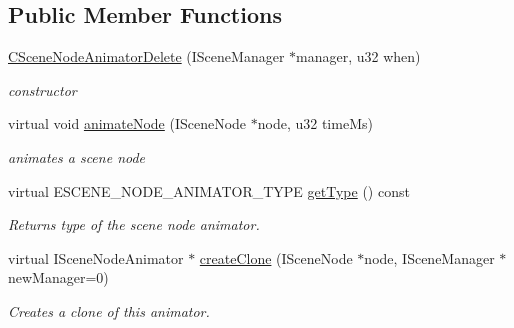 \subsection*{Public Member Functions}
\begin{DoxyCompactItemize}
\item 
\hypertarget{classirr_1_1scene_1_1_c_scene_node_animator_delete_abafe59c23c529ef832bee1e5ee795e9d}{\hyperlink{classirr_1_1scene_1_1_c_scene_node_animator_delete_abafe59c23c529ef832bee1e5ee795e9d}{C\-Scene\-Node\-Animator\-Delete} (I\-Scene\-Manager $\ast$manager, u32 when)}\label{classirr_1_1scene_1_1_c_scene_node_animator_delete_abafe59c23c529ef832bee1e5ee795e9d}

\begin{DoxyCompactList}\small\item\em constructor \end{DoxyCompactList}\item 
\hypertarget{classirr_1_1scene_1_1_c_scene_node_animator_delete_a66db5332d522d419f96350e77a6ae967}{virtual void \hyperlink{classirr_1_1scene_1_1_c_scene_node_animator_delete_a66db5332d522d419f96350e77a6ae967}{animate\-Node} (I\-Scene\-Node $\ast$node, u32 time\-Ms)}\label{classirr_1_1scene_1_1_c_scene_node_animator_delete_a66db5332d522d419f96350e77a6ae967}

\begin{DoxyCompactList}\small\item\em animates a scene node \end{DoxyCompactList}\item 
\hypertarget{classirr_1_1scene_1_1_c_scene_node_animator_delete_a9dd03a1b6f6e37f568caad65926b07ce}{virtual E\-S\-C\-E\-N\-E\-\_\-\-N\-O\-D\-E\-\_\-\-A\-N\-I\-M\-A\-T\-O\-R\-\_\-\-T\-Y\-P\-E \hyperlink{classirr_1_1scene_1_1_c_scene_node_animator_delete_a9dd03a1b6f6e37f568caad65926b07ce}{get\-Type} () const }\label{classirr_1_1scene_1_1_c_scene_node_animator_delete_a9dd03a1b6f6e37f568caad65926b07ce}

\begin{DoxyCompactList}\small\item\em Returns type of the scene node animator. \end{DoxyCompactList}\item 
virtual I\-Scene\-Node\-Animator $\ast$ \hyperlink{classirr_1_1scene_1_1_c_scene_node_animator_delete_a9e054cdbbaf3d80781fdcdaa44d7fcba}{create\-Clone} (I\-Scene\-Node $\ast$node, I\-Scene\-Manager $\ast$new\-Manager=0)
\begin{DoxyCompactList}\small\item\em Creates a clone of this animator. \end{DoxyCompactList}\end{DoxyCompactItemize}
